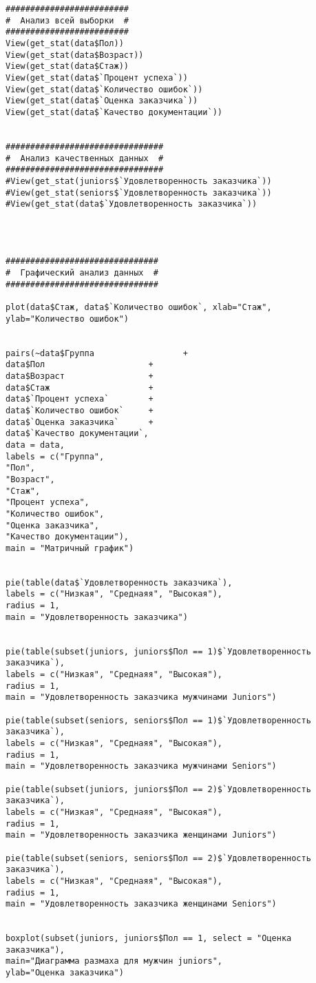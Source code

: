 \begin{verbatim}
#########################
#  Анализ всей выборки  #
#########################
View(get_stat(data$Пол))
View(get_stat(data$Возраст))
View(get_stat(data$Стаж))
View(get_stat(data$`Процент успеха`))
View(get_stat(data$`Количество ошибок`))
View(get_stat(data$`Оценка заказчика`))
View(get_stat(data$`Качество документации`))


################################
#  Анализ качественных данных  #
################################
#View(get_stat(juniors$`Удовлетворенность заказчика`))
#View(get_stat(seniors$`Удовлетворенность заказчика`))
#View(get_stat(data$`Удовлетворенность заказчика`))




###############################
#  Графический анализ данных  #
###############################

plot(data$Стаж, data$`Количество ошибок`, xlab="Стаж", ylab="Количество ошибок")


pairs(~data$Группа                  +
data$Пол                     +
data$Возраст                 +
data$Стаж                    +
data$`Процент успеха`        +
data$`Количество ошибок`     +
data$`Оценка заказчика`      +
data$`Качество документации`,
data = data,
labels = c("Группа",
"Пол",
"Возраст",
"Стаж",
"Процент успеха",
"Количество ошибок",
"Оценка заказчика",
"Качество документации"),
main = "Матричный график")


pie(table(data$`Удовлетворенность заказчика`),
labels = c("Низкая", "Среднаяя", "Высокая"),
radius = 1,
main = "Удовлетворенность заказчика")


pie(table(subset(juniors, juniors$Пол == 1)$`Удовлетворенность заказчика`),
labels = c("Низкая", "Среднаяя", "Высокая"),
radius = 1,
main = "Удовлетворенность заказчика мужчинами Juniors")

pie(table(subset(seniors, seniors$Пол == 1)$`Удовлетворенность заказчика`),
labels = c("Низкая", "Среднаяя", "Высокая"),
radius = 1,
main = "Удовлетворенность заказчика мужчинами Seniors")

pie(table(subset(juniors, juniors$Пол == 2)$`Удовлетворенность заказчика`),
labels = c("Низкая", "Среднаяя", "Высокая"),
radius = 1,
main = "Удовлетворенность заказчика женщинами Juniors")

pie(table(subset(seniors, seniors$Пол == 2)$`Удовлетворенность заказчика`),
labels = c("Низкая", "Среднаяя", "Высокая"),
radius = 1,
main = "Удовлетворенность заказчика женщинами Seniors")


boxplot(subset(juniors, juniors$Пол == 1, select = "Оценка заказчика"),
main="Диаграмма размаха для мужчин juniors",
ylab="Оценка заказчика")


\end{verbatim}
